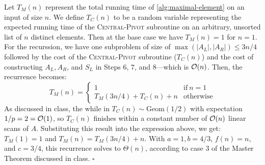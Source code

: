 \documentclass{article}
\begin{document}
\begin{enumerate}[leftmargin={*}, font={\bf}, label={\arabic*.}, ref={\arabic*}]
\begin{enumerate}
        Let $T_M(n)$ represent the total running time of \autoref{alg:maximal-element} on an input of size
        $n$. We define $T_C(n)$ to be a random variable representing the expected running time of the
        \textsc{Central-Pivot} subroutine on an arbitrary, unsorted list of $n$ distinct elements. Then at
        the base case we have $T_M(n) = 1$ for $n = 1$. For the recurssion, we have one subproblem of size of
        $\max(|A_L|, |A_R|) \leq 3n/4$ followed by the cost of the \textsc{Central-Pivot} subroutine
        ($T_C(n)$) and the cost of constructing $A_L, A_R$, and $S_L$ in Steps $6$, $7$, and $8$---which is
        $\operatorname*{\mathcal{O}}(n)$. Then, the recurrence becomes:
        \[
          T_M(n) =
            \begin{cases}
              1 & \text{if}\ n = 1 \\
              T_M(3n/4) + T_C(n) + n & \text{otherwise}
            \end{cases}
        \]
        As discussed in class, the while in $T_C(n) \sim \text{Geom}(1/2)$ with expectation $1/p = 2 = \operatorname*{\mathcal{O}}(1)$,
        so $T_C(n)$ finishes within a constant number of $\operatorname*{\mathcal{O}}(n)$ linear scans of $A$. Substituting this result
        into the expression above, we get: $T_M(1) = 1$ and $T_M(n) = T_M(3n/4) + n$. With $a = 1, b = 4/3$, $
        f(n) = n$, and $c = 3/4$, this recurrence solves to $\Theta(n)$, according to case $3$ of the Master
        Theorem discussed in class. \hfill $\square$
    \end{enumerate}
\end{enumerate}
\end{document}
